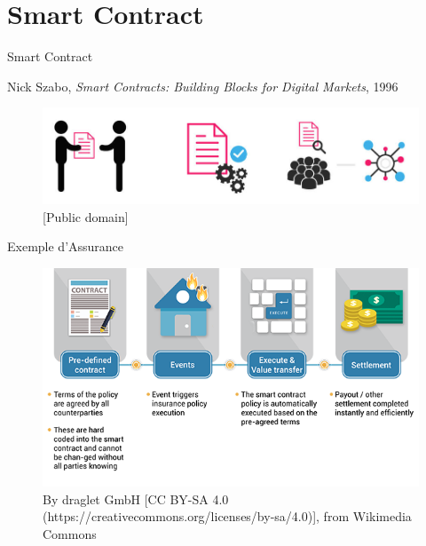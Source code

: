 \documentclass[xcolor=dvipsnames]{beamer}
\begin{document}
\section{Smart Contract}

\begin{frame}{Smart Contract}
	
	
	\begin{center}
		Nick Szabo, \textit{Smart Contracts: Building Blocks for Digital Markets}, 1996
	\end{center}		
	
	\begin{figure}
		\centering
		\includegraphics[scale=.25]{smart_contract}
		\caption{[Public domain]}
	\end{figure}
	
	
\end{frame}

\begin{frame}{Exemple d'Assurance}

	\begin{figure}
		\centering
		\includegraphics[scale=.5]{insurance_contract}
		\caption{By draglet GmbH [CC BY-SA 4.0 (https://creativecommons.org/licenses/by-sa/4.0)], from Wikimedia Commons}
	\end{figure}

\end{frame}
\end{document}
